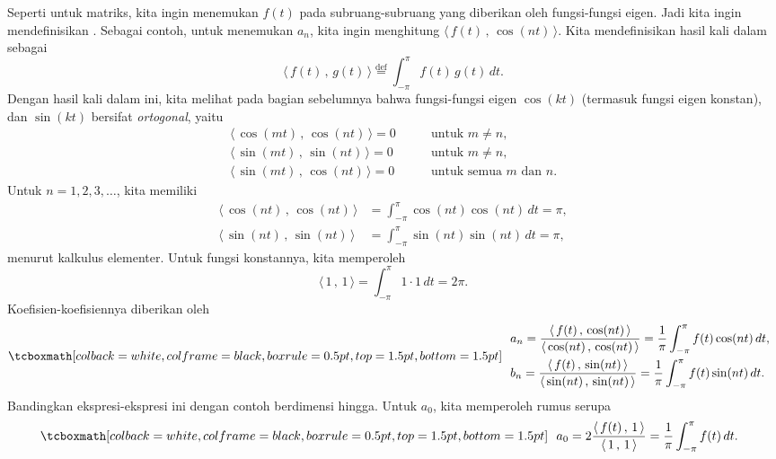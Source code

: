 Seperti untuk matriks, kita ingin menemukan \emph{}
$f(t)$ pada subruang-subruang yang diberikan oleh fungsi-fungsi eigen.  Jadi kita ingin
mendefinisikan \emph{}.  Sebagai contoh, untuk
menemukan $a_n$,
kita ingin menghitung $\langle \, f(t) \, , \, \cos (nt) \, \rangle$.
Kita mendefinisikan hasil kali dalam sebagai
\begin{equation*}
\langle \, f(t)\, , \, g(t) \, \rangle \overset{\text{def}}{=}
\int_{-\pi}^\pi f(t) \, g(t) \, dt .
\end{equation*}
Dengan hasil kali dalam ini,
kita melihat pada bagian sebelumnya bahwa fungsi-fungsi eigen $\cos (kt)$
(termasuk fungsi eigen konstan), dan
$\sin (kt)$ bersifat \emph{ortogonal}, yaitu
\begin{align*}
\langle \, \cos (mt)\, , \, \cos (nt) \, \rangle = 0 & \qquad \text{untuk } m \neq n , \\
\langle \, \sin (mt)\, , \, \sin (nt) \, \rangle = 0 & \qquad \text{untuk } m \neq n , \\
\langle \, \sin (mt)\, , \, \cos (nt) \, \rangle = 0 & \qquad \text{untuk semua } m \text{ dan } n .
\end{align*}
Untuk $n=1,2,3,\ldots$,
kita memiliki
\begin{align*}
\langle \, \cos (nt) \, , \, \cos (nt) \, \rangle &=
\int_{-\pi}^\pi \cos(nt)\cos(nt) \, dt
=
\pi,
\\
\langle \, \sin (nt) \, , \, \sin (nt) \, \rangle &=
\int_{-\pi}^\pi \sin(nt)\sin(nt) \, dt
=
\pi,
\end{align*}
menurut kalkulus elementer.  Untuk fungsi konstannya, kita memperoleh
\begin{equation*}
\langle \, 1 \, , \, 1 \, \rangle
=
\int_{-\pi}^\pi 1 \cdot 1 \, dt
 = 2\pi.
\end{equation*}
Koefisien-koefisiennya diberikan oleh
\begin{equation*}
\mybxbg{~~
\begin{aligned}
& a_n =
\frac{\langle \, f(t) \, , \, \cos (nt) \, \rangle}{\langle \, \cos (nt) \, , \,
\cos (nt) \, \rangle}
= 
\frac{1}{\pi} \int_{-\pi}^\pi f(t) \cos (nt) \, dt , \\
& b_n =
\frac{\langle \, f(t) \, , \, \sin (nt) \, \rangle}{\langle \, \sin (nt) \, , \,
\sin (nt) \, \rangle}
= 
\frac{1}{\pi} \int_{-\pi}^\pi f(t) \sin (nt) \, dt .
\end{aligned}
~~}
\end{equation*}
Bandingkan ekspresi-ekspresi ini dengan contoh berdimensi hingga.
Untuk $a_0$, kita memperoleh rumus serupa
\begin{equation*}
\mybxbg{~~
a_0 = 2
\frac{\langle \, f(t) \, , \, 1 \, \rangle}{\langle \, 1 \, , \,
1 \, \rangle}
=
\frac{1}{\pi} \int_{-\pi}^\pi f(t) \, dt .
~~}
\end{equation*}

